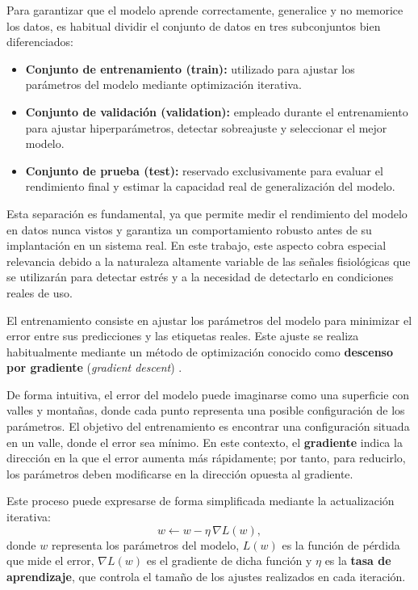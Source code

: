 \documentclass{report}
\begin{document}
Para garantizar que el modelo aprende correctamente, generalice y no memorice los datos, es habitual dividir el conjunto de datos en tres subconjuntos bien diferenciados:
\begin{itemize}
    \item \textbf{Conjunto de entrenamiento (train):} utilizado para ajustar los parámetros del modelo mediante optimización iterativa.
    \item \textbf{Conjunto de validación (validation):} empleado durante el entrenamiento para ajustar hiperparámetros, detectar sobreajuste y seleccionar el mejor modelo.
    \item \textbf{Conjunto de prueba (test):} reservado exclusivamente para evaluar el rendimiento final y estimar la capacidad real de generalización del modelo.
\end{itemize}

Esta separación es fundamental, ya que permite medir el rendimiento del modelo en datos nunca vistos y garantiza un comportamiento robusto antes de su implantación en un sistema real. En este trabajo, este aspecto cobra especial relevancia debido a la naturaleza altamente variable de las señales fisiológicas que se utilizarán para detectar estrés y a la necesidad de detectarlo en condiciones reales de uso.

El entrenamiento consiste en ajustar los parámetros del modelo para minimizar el error entre sus predicciones y las etiquetas reales. Este ajuste se realiza habitualmente mediante un método de optimización conocido como \textbf{descenso por gradiente} (\textit{gradient descent}) \cite{lecun2015deep,goodfellow2016deep}.

De forma intuitiva, el error del modelo puede imaginarse como una superficie con valles y montañas, donde cada punto representa una posible configuración de los parámetros. El objetivo del entrenamiento es encontrar una configuración situada en un valle, donde el error sea mínimo. En este contexto, el \textbf{gradiente} indica la dirección en la que el error aumenta más rápidamente; por tanto, para reducirlo, los parámetros deben modificarse en la dirección opuesta al gradiente.

Este proceso puede expresarse de forma simplificada mediante la actualización iterativa:
\[
w \leftarrow w - \eta \, \nabla L(w),
\]
donde \(w\) representa los parámetros del modelo, \(L(w)\) es la función de pérdida que mide el error, \(\nabla L(w)\) es el gradiente de dicha función y \(\eta\) es la \textbf{tasa de aprendizaje}, que controla el tamaño de los ajustes realizados en cada iteración.
\end{document}

